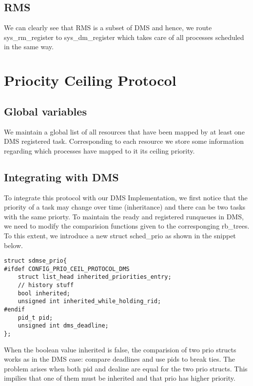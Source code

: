\documentclass[12pt, letterpaper]{article}
\begin{document}
\subsection{RMS}
We can clearly see that RMS is a subset of DMS and hence, we route sys\_rm\_register to sys\_dm\_register which takes care of all processes scheduled in the same way.
\section{Priocity Ceiling Protocol}
\subsection{Global variables} 
We maintain a global list of all resources that have been mapped by at least one DMS registered task. Corresponding to each resource we store some information regarding which processes have mapped to it 
its ceiling priority.
\subsection{Integrating with DMS}
To integrate this protocol with our DMS Implementation, we first notice that the priority of a task may change over time (inheritance) and there can be two tasks with the same priorty. To maintain the 
ready and registered runqueues in DMS, we need to modify the comparision functions given to the corresponging {\ttfamily rb\_tree}s. To this extent, we introduce a new struct {\ttfamily sched\_prio} as 
shown in the snippet below.
\begin{lstlisting}
struct sdmse_prio{
#ifdef CONFIG_PRIO_CEIL_PROTOCOL_DMS
    struct list_head inherited_priorities_entry;
    // history stuff
    bool inherited;
    unsigned int inherited_while_holding_rid;
#endif
    pid_t pid;
    unsigned int dms_deadline;
};
\end{lstlisting}
When the boolean value inherited is false, the comparision of two prio structs works as in the DMS case: compare deadlines and use pids to break ties. The problem arises when both pid and dealine are equal
for the two prio structs. This impilies that one of them must be inherited and that prio has higher priority.
\end{document}
